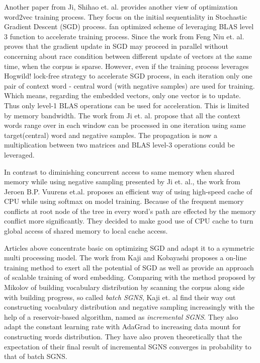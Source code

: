 Another paper from Ji, Shihao et. al. \cite{ji2016parallelizing} provides another view of optimization word2vec training process. They focus on the initial sequentiality in Stochastic Gradient Descent (SGD) process. fan optimized scheme of leveraging BLAS level 3 function to accelerate training process. Since the work from Feng Niu et. al. \cite{recht2011hogwild} proves that the gradient update in SGD may proceed in parallel without concerning about race condition between different update of vectors at the same time, when the corpus is sparse. However, even if the training process leverages Hogwild! \cite{recht2011hogwild} lock-free strategy to accelerate SGD process, in each iteration only one pair of context word - central word (with negative samples) are used for training. Which means, regarding the embedded vectors, only one vector is to update. Thus only level-1 BLAS operations can be used for acceleration. This is limited by memory bandwidth. The work from Ji et. al. propose that all the context words range over in each window can be processed in one iteration using same target(central) word and negative samples. The propagation is now a multiplication between two matrices and BLAS level-3 operations could be leveraged.

In contrast to diminishing concurrent access to same memory when shared memory while using negative sampling presented by Ji et. al., the work from Jeroen B.P. Vuurens et.al. \cite{eickhoff2016efficient} proposes an efficient way of using high-speed cache of CPU while using softmax on model training. Because of the frequent memory conflicts at root node of the tree in every word's path are effected by the memory conflict more significantly. They decided to make good use of CPU cache to turn global access of shared memory to local cache access.

Articles above concentrate basic on optimizing SGD and adapt it to a symmetric multi processing model. The work from Kaji and Kobayashi \cite{kaji2017incremental} proposes a on-line training method to exert all the potential of SGD as well as provide an approach of scalable training of word embedding. Comparing with the method proposed by Mikolov \cite{mikolov2013distributed} of building vocabulary distribution by scanning the corpus along side with building progress, so called \emph{batch SGNS}, Kaji et. al find their way out constructing vocabulary distribution and negative sampling increasingly with the help of a reservoir-based algorithm, named as \emph{incremental SGNS}. They also adapt the constant learning rate with AdaGrad to  increasing data mount for constructing words distribution. They have also proven theoretically that the expectation of their final result of incremental SGNS converges in probability to that of batch SGNS.